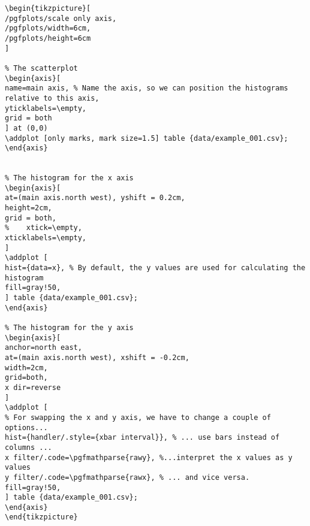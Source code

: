 \begin{lstlisting}
\begin{tikzpicture}[
/pgfplots/scale only axis,
/pgfplots/width=6cm,
/pgfplots/height=6cm
]

% The scatterplot
\begin{axis}[
name=main axis, % Name the axis, so we can position the histograms relative to this axis,
yticklabels=\empty,
grid = both
] at (0,0)
\addplot [only marks, mark size=1.5] table {data/example_001.csv};
\end{axis}


% The histogram for the x axis
\begin{axis}[
at=(main axis.north west), yshift = 0.2cm,
height=2cm,
grid = both,
%    xtick=\empty,
xticklabels=\empty,
] 
\addplot [
hist={data=x}, % By default, the y values are used for calculating the histogram
fill=gray!50,
] table {data/example_001.csv};
\end{axis}

% The histogram for the y axis
\begin{axis}[
anchor=north east,
at=(main axis.north west), xshift = -0.2cm,
width=2cm,
grid=both,
x dir=reverse
]
\addplot [
% For swapping the x and y axis, we have to change a couple of options...
hist={handler/.style={xbar interval}}, % ... use bars instead of columns ...
x filter/.code=\pgfmathparse{rawy}, %...interpret the x values as y values 
y filter/.code=\pgfmathparse{rawx}, % ... and vice versa.
fill=gray!50,
] table {data/example_001.csv};
\end{axis}
\end{tikzpicture}
\end{lstlisting}